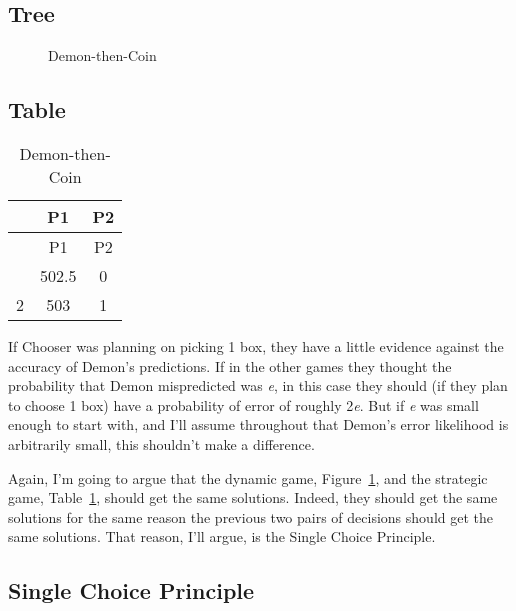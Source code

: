 \documentclass[
  10pt,
  letterpaper,
  DIV=11,
  numbers=noendperiod,
  twoside]{scrartcl}
\begin{document}
\subsection{Tree}

\begin{figure}


\caption{\label{fig-demon-then-coin}Demon-then-Coin}

\end{figure}%

\subsection{Table}

\begin{longtable}[]{@{}ccc@{}}
\caption{Demon-then-Coin}\label{tbl-demon-then-coin}\tabularnewline
\toprule\noalign{}
& P1 & P2 \\
\midrule\noalign{}
\endfirsthead
\toprule\noalign{}
& P1 & P2 \\
\midrule\noalign{}
\endhead
\bottomrule\noalign{}
\endlastfoot
1 & 502.5 & 0 \\
2 & 503 & 1 \\
\end{longtable}

If Chooser was planning on picking 1 box, they have a little evidence
against the accuracy of Demon's predictions. If in the other games they
thought the probability that Demon mispredicted was \emph{e}, in this
case they should (if they plan to choose 1 box) have a probability of
error of roughly 2\emph{e}. But if \emph{e} was small enough to start
with, and I'll assume throughout that Demon's error likelihood is
arbitrarily small, this shouldn't make a difference.

Again, I'm going to argue that the dynamic game,
Figure~\ref{fig-demon-then-coin}, and the strategic game,
Table~\ref{tbl-demon-then-coin}, should get the same solutions. Indeed,
they should get the same solutions for the same reason the previous two
pairs of decisions should get the same solutions. That reason, I'll
argue, is the Single Choice Principle.

\subsection{Single Choice Principle}\label{sec-scp-definition}
\end{document}
